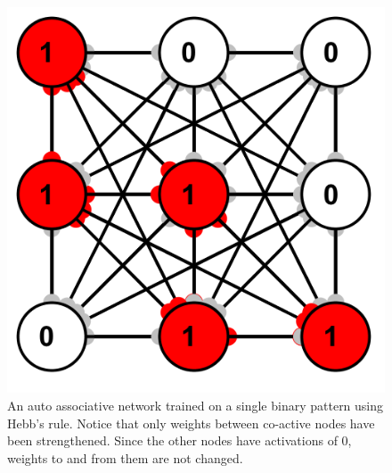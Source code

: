 \begin{figure}[h]
\centering
\includegraphics[scale=.6]{./images/hebb_binary_9.png}
\caption[Simbrain screenshot.]{An auto associative network trained on a single binary pattern using Hebb's rule. Notice that only weights between co-active nodes have been strengthened. Since the other nodes have activations of 0, weights to and from them are not changed.}
\label{binary}
\end{figure}

